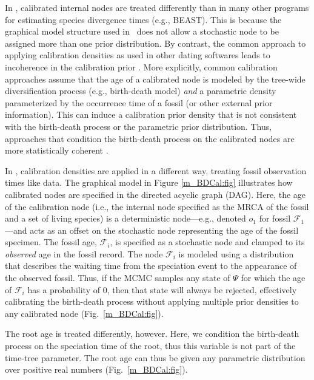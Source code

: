 In \RevBayes, calibrated internal nodes are treated differently than in many other programs for estimating species divergence times (e.g., BEAST).
This is because the graphical model structure used in \RevBayes~does not allow a stochastic node to be assigned more than one prior distribution. 
By contrast, the common approach to applying calibration densities as used in other dating softwares leads to incoherence in the calibration prior \citep{warnock12,heled12,heath2013fossilized}. 
More explicitly, common calibration approaches assume that the age of a calibrated node is modeled by the tree-wide diversification process (e.g., birth-death model) \textit{and} a parametric density parameterized by the occurrence time of a fossil (or other external prior information).
This can induce a calibration prior density that is not consistent with the birth-death process or the parametric prior distribution. 
Thus, approaches that condition the birth-death process on the calibrated nodes are more statistically coherent \citep{yang06}.

In \RevBayes, calibration densities are applied in a different way, treating fossil observation times like data. 
The graphical model in Figure \ref{m_BDCal:fig} illustrates how calibrated nodes are specified in the directed acyclic graph (DAG).
Here, the age of the calibration node (i.e., the internal node specified as the MRCA of the fossil and a set of living species) is a deterministic node---e.g., denoted $o_1$ for fossil $\mathcal{F}_1$---and acts as an offset on the stochastic node representing the age of the fossil specimen.
The fossil age, $\mathcal{F}_i$, is specified as a stochastic node and clamped to its \textit{observed} age in the fossil record. 
The node $\mathcal{F}_i$ is modeled using a distribution that describes the waiting time from the speciation event to the appearance of the observed fossil. 
Thus, if the MCMC samples any state of $\Psi$ for which the age of $\mathcal{F}_i$ has a probability of 0, then that state will always be rejected, effectively calibrating the birth-death process without applying multiple prior densities to any calibrated node (Fig.~\ref{m_BDCal:fig}).

The root age is treated differently, however. 
Here, we condition the birth-death process on the speciation time of the root, thus this variable is not part of the time-tree parameter. 
The root age can thus be given any parametric distribution over positive real numbers (Fig.~\ref{m_BDCal:fig}).

